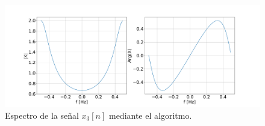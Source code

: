 \documentclass[letterpaper]{article}
\begin{document}
\begin{figure}[H]
\centering
\includegraphics[width=\textwidth]{Img/punto_3_e_3.png}
\caption{Espectro de la señal $x_{3}[n]$ mediante el algoritmo.}
\label{fig.3eiii}
\end{figure}
\end{document}
